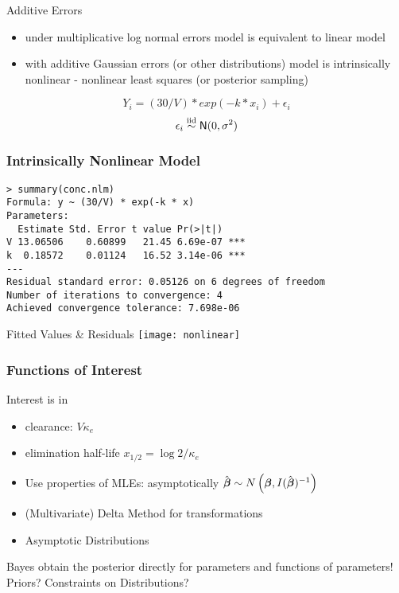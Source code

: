 \documentclass[]{beamer}
\begin{document}
\begin{frame} {Additive Errors}
  \begin{itemize}
  \item  under  multiplicative log normal errors model is equivalent
    to linear model \pause
  \item with additive Gaussian errors (or other distributions) model
    is intrinsically nonlinear - nonlinear least squares (or posterior
    sampling) \pause
  \end{itemize}
$$ Y_i = (30/V) * exp(-k * x_i) + \epsilon_i$$ \pause
$$\epsilon_i \mathrel{\mathop{\sim}\limits^{\rm iid}} \textsf{N}(0, \sigma^2)$$ 
\end{frame}
\begin{frame}[fragile]\frametitle{Intrinsically Nonlinear Model}
\begin{verbatim}
> summary(conc.nlm)
Formula: y ~ (30/V) * exp(-k * x)
Parameters:
  Estimate Std. Error t value Pr(>|t|)    
V 13.06506    0.60899   21.45 6.69e-07 ***
k  0.18572    0.01124   16.52 3.14e-06 ***
---
Residual standard error: 0.05126 on 6 degrees of freedom
Number of iterations to convergence: 4 
Achieved convergence tolerance: 7.698e-06
\end{verbatim}
\end{frame}
\begin{frame} {Fitted Values \& Residuals}
  \texttt{[image: nonlinear]}
\end{frame}

\begin{frame} \frametitle{Functions of Interest}
Interest is in
\begin{itemize}
\item clearance: $V \kappa_e$ \pause
\item elimination half-life $x_{1/2} = \log 2/\kappa_e$ \pause
\end{itemize}

  \begin{itemize}
  \item   Use properties of MLEs: asymptotically  $\hat{\boldsymbol{\beta}} \sim N\left(\boldsymbol{\beta},
    I(\hat{\boldsymbol{\beta}})^{-1}\right)$ \pause
  \item (Multivariate) Delta Method for transformations  \pause
\item Asymptotic Distributions
  \end{itemize}

Bayes obtain the posterior directly for parameters and functions of parameters!    Priors?  Constraints on Distributions?
\end{frame}
\end{document}
